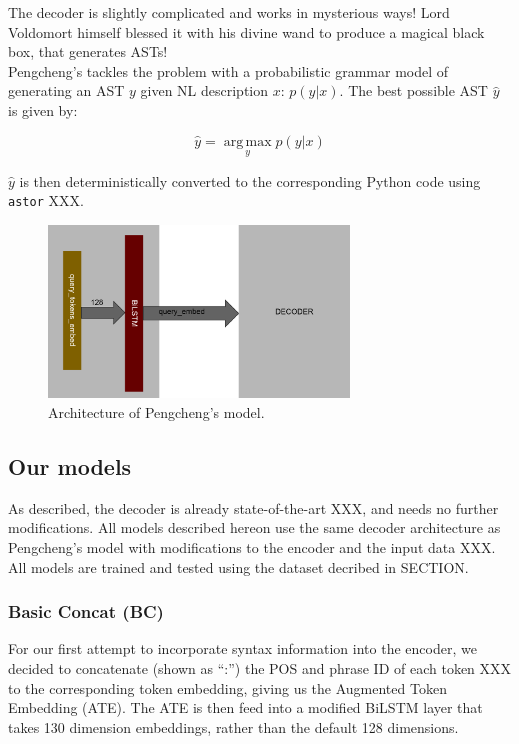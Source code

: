 \documentclass{IEEEtran}
\begin{document}
      \hspace*{4mm}The decoder is slightly complicated and works in mysterious ways! Lord 
      Voldomort himself
      blessed it with his divine wand to produce a magical black box, that generates
      ASTs! \\
      \hspace*{4mm}Pengcheng's tackles the problem with a probabilistic grammar model of
      generating an AST $ y $ given NL description $ x $: $ p(y\vert x) $. The best possible AST 
      $ \hat{y} $ is given by:

      \begin{equation}
        \label{eq:pengcheng}
        \hat{y} = \operatorname*{arg\,max}_y p(y\vert x)
      \end{equation}

      $ \hat{y} $ is then deterministically converted to the corresponding Python code using
      \texttt{astor} XXX.

      \begin{figure}[h]
        \centering
        \includegraphics[width=8cm]{pengcheng.png}
        \caption{Architecture of Pengcheng's model.}
        \label{fig:pengcheng}
      \end{figure}

      \subsection{Our models}
      As described, the decoder is already state-of-the-art XXX, and needs no further 
      modifications. All models described hereon use the same decoder architecture as Pengcheng's 
      model with modifications to the encoder and the input data XXX. All models are trained and 
      tested using the dataset decribed in SECTION. %

        \subsubsection{Basic Concat (BC)}
        For our first attempt to incorporate syntax information into the encoder, we decided to 
        concatenate (shown as ``:'') the POS and phrase ID of each token XXX to the corresponding 
        token embedding, giving us the Augmented Token Embedding (ATE). The ATE is then feed into 
        a modified BiLSTM
        layer that takes 130 dimension embeddings, rather than the default 128 dimensions. \\
\end{document}
